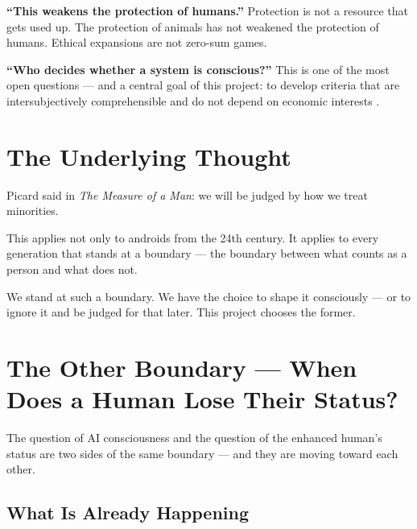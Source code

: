 \documentclass[fleqn,10pt]{SelfArx} %
\newlength{\tocsep}
\begin{document}
\textbf{``This weakens the protection of humans.''} Protection is not a resource that gets used up. The protection of animals has not weakened the protection of humans. Ethical expansions are not zero-sum games.

\textbf{``Who decides whether a system is conscious?''} This is one of the most open questions --- and a central goal of this project: to develop criteria that are intersubjectively comprehensible and do not depend on economic interests \cite{AvilaNegri:2021,DeGraaf:2022,Speculating:2021}.


\section{The Underlying Thought}
\label{sec:thought}


Picard said in \textit{The Measure of a Man}: we will be judged by how we treat minorities.

This applies not only to androids from the 24th century. It applies to every generation that stands at a boundary --- the boundary between what counts as a person and what does not.

We stand at such a boundary. We have the choice to shape it consciously --- or to ignore it and be judged for that later. This project chooses the former.


\section{The Other Boundary --- When Does a Human Lose Their Status?}
\label{sec:boundary}


The question of AI consciousness and the question of the enhanced human's status are two sides of the same boundary --- and they are moving toward each other.

\subsection{What Is Already Happening}
\end{document}
